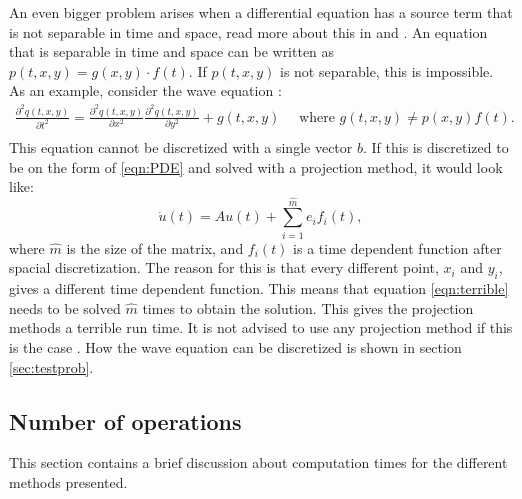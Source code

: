 \noindent An even bigger problem arises when a differential equation has a source term that is not separable in time and space, read more about this in \cite{elena} and \citep{min}. An equation that is separable in time and space can be written as $p(t,x,y) = g(x,y) \cdot f(t)$. If $p(t,x,y)$ is not separable, this is impossible. As an example, consider the wave equation \cite{waveequ}:
\begin{equation*}
\begin{aligned}
\frac{\partial^2 q(t,x,y)}{\partial t^2} = \frac{\partial^2 q(t,x,y)}{\partial x^2 } \frac{\partial^2 q(t,x,y)}{\partial y^2 } + g(t,x,y) \quad \text{ where } g(t,x,y) \neq p(x,y) f(t). \\
\end{aligned}
\end{equation*}
This equation cannot be discretized with a single vector $b$. If this is discretized to be on the form of \eqref{eqn:PDE} and solved with a projection method, it would look like:
\begin{equation*} \label{eqn:terrible}
\dot{u}(t) = A u(t) + \sum \limits_{i = 1}^{\hat{m}} e_i f_i(t),
\end{equation*}
where $\hat{m}$ is the size of the matrix, and $f_i(t)$ is a time dependent function after spacial discretization. The reason for this is that every different point, $x_i$ and $y_i$, gives a different time dependent function.%
This means that equation \eqref{eqn:terrible} needs to be solved $\hat{m}$ times to obtain the solution. This gives the projection methods a terrible run time. It is not advised  to use any projection method if this is the case \cite{min}. How the wave equation can be discretized is shown in section \ref{sec:testprob}.


\subsection{Number of operations}%
This section contains a brief discussion about computation times for the different methods presented.


